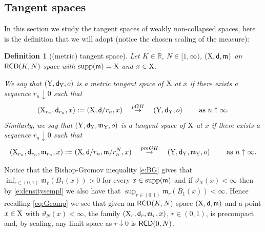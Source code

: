 \documentclass[reqno,11pt]{article}
\numberwithin{equation}{section}
\newcommand{\R}{\mathbb{R}}
\newcommand{\mm}{{\mbox{\boldmath$m$}}}
\newcommand{\sfd}{{\sf d}}
\newcommand{\supp}{\mathop{\rm supp}\nolimits}   %
\renewcommand{\mm}{\mathfrak m}                                %
\newtheorem{definition}[theorem]{Definition}
\newcommand{\X}{{\rm X}}
\newcommand{\Y}{{\rm Y}}
\newcommand{\RCD}{{\sf RCD}}
\begin{document}
\subsection{Tangent spaces}
In this section we study the tangent spaces of weakly non-collapsed spaces, here is the definition that we will adopt (notice the chosen scaling of the measure):
\begin{definition}[(metric) tangent space]
Let $K\in\R$, $N\in[1,\infty)$, $(\X,\sfd,\mm)$ an $\RCD(K,N)$ space with $\supp(\mm)=\X$ and $x\in\X$.

We say that $(\Y,\sfd_\Y,o)$ is a \emph{metric tangent space} of $\X$ at $x$ if there exists a sequence $r_n\downarrow0$ such that
\[
(\X_{r_n},\sfd_{r_n},x):=(\X,\sfd/r_n,x)\quad\stackrel{pGH}\to\quad (\Y,\sfd_\Y,o)\qquad\text{ as }n\uparrow\infty.
\]
Similarly, we say that $(\Y,\sfd_\Y,\mm_\Y,o)$ is a \emph{tangent space} of $\X$ at $x$ if there exists a sequence $r_n\downarrow0$ such that
\[
(\X_{r_n},\sfd_{r_n},\mm_{r_n},x):=(\X,\sfd/r_n,\mm/{r_n^N},x)\quad \stackrel{pmGH}\to\quad(\Y,\sfd_\Y,\mm_\Y,o)\qquad\text{ as }n\uparrow\infty.
\]
\end{definition} 
Notice that the Bishop-Gromov inequality \eqref{e:BG} gives that $\inf_{r\in(0,1)}\mm_r(B_1(x))>0$ for every $x\in\supp(\mm)$ and if $\vartheta_N(x)<\infty$ then by \eqref{e:densitysempl} we also have that $\sup_{r\in(0,1)}\mm_r(B_1(x))<\infty$. Hence recalling \eqref{eq:Gcomp} we see that given an $\RCD(K,N)$ space $(\X,\sfd,\mm)$ and a point $x\in \X$ with $\vartheta_N(x)<\infty$, the family $(\X_r,\sfd_r,\mm_r,x)$, $r\in(0,1)$, is precompact and{, by scaling, }any limit space as $r\downarrow 0$ is $\RCD(0,N)$.
\end{document}
